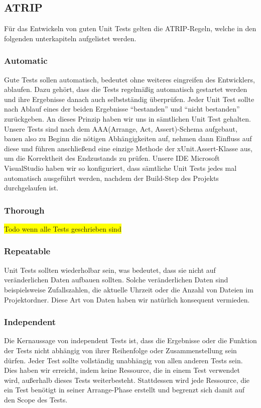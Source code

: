 \documentclass[
10pt, %
a4paper, %
oneside, %
headinclude,footinclude, %
BCOR5mm, %
]{scrartcl}
\begin{document}
\subsection{ATRIP}
Für das Entwickeln von guten Unit Tests gelten die ATRIP-Regeln, welche in den folgenden unterkapiteln aufgelistet werden.
\subsubsection{Automatic}
Gute Tests sollen automatisch, bedeutet ohne weiteres eingreifen des Entwicklers, ablaufen. Dazu gehört, dass die Tests regelmäßig automatisch gestartet werden und ihre Ergebnisse danach auch selbstständig überprüfen. Jeder Unit Test sollte nach Ablauf eines der beiden Ergebnisse \enquote{bestanden} und \enquote{nicht bestanden} zurückgeben.
An dieses Prinzip haben wir uns in sämtlichen Unit Test gehalten. Unsere Tests sind nach dem AAA(Arrange, Act, Assert)-Schema aufgebaut, bauen also zu Beginn die nötigen Abhängigkeiten auf, nehmen dann Einfluss auf diese und führen anschließend eine einzige Methode der xUnit.Assert-Klasse aus, um die Korrektheit des Endzustands zu prüfen. Unsere IDE Microsoft VisualStudio haben wir so konfiguriert, dass sämtliche Unit Tests jedes mal automatisch ausgeführt werden, nachdem der Build-Step des Projekts durchgelaufen ist.

\subsubsection{Thorough}
\colorbox{yellow}{Todo wenn alle Tests geschrieben sind}
\subsubsection{Repeatable}
Unit Tests sollten wiederholbar sein, was bedeutet, dass sie nicht auf veränderlichen Daten aufbauen sollten. Solche veränderlichen Daten sind beispielsweise Zufallszahlen, die aktuelle Uhrzeit oder die Anzahl von Dateien im Projektordner. Diese Art von Daten haben wir natürlich konsequent vermieden.
\subsubsection{Independent}
Die Kernaussage von independent Tests ist, dass die Ergebnisse oder die Funktion der Tests nicht abhängig von ihrer Reihenfolge oder Zusammenstellung sein dürfen. Jeder Test sollte vollständig unabhängig von allen anderen Tests sein. Dies haben wir erreicht, indem keine Ressource, die in einem Test verwendet wird, außerhalb dieses Tests weiterbesteht. Stattdessen wird jede Ressource, die ein Test benötigt in seiner Arrange-Phase erstellt und begrenzt sich damit auf den Scope des Tests.
\end{document}
